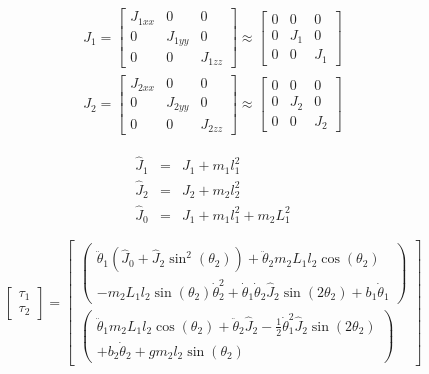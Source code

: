 \begin{eqnarray}
J_1=
\begin{bmatrix}
J_{1xx} & 0 & 0\\
0 & J_{1yy} & 0\\
0 & 0 & J_{1zz}
\end{bmatrix}
\approx
\begin{bmatrix}
0 & 0 & 0\\
0 & J_{1} & 0\\
0 & 0 & J_{1}
\end{bmatrix}
\nonumber \\
J_2=
\begin{bmatrix}
J_{2xx} & 0 & 0\\
0 & J_{2yy} & 0\\
0 & 0 & J_{2zz}
\end{bmatrix}
\approx
\begin{bmatrix}
0 & 0 & 0\\
0 & J_{2} & 0\\
0 & 0 & J_{2}
\end{bmatrix}
\end{eqnarray}

\begin{eqnarray}
\hat{J}_1 &=& J_1 + m_1l^2_1	\nonumber	\\
\hat{J}_2 &=& J_2 + m_2l^2_2	\nonumber	\\
\hat{J}_0 &=& J_1 + m_1l^2_1 + m_2L^2_1
\end{eqnarray}

\begin{equation}
\begin{bmatrix}
\tau_1 \\
\tau_2
\end{bmatrix}
=
\begin{bmatrix}
\begin{pmatrix}
\ddot{\theta}_1(\hat{J}_0+\hat{J}_2\sin^2(\theta_2))+\ddot{\theta}_2m_2L_1l_2\cos(\theta_2)			\\
-m_2L_1l_2\sin(\theta_2)\dot{\theta}^2_2+\dot{\theta}_1\dot{\theta}_2\hat{J}_2\sin(2\theta_2)+b_1\dot{\theta}_1
\end{pmatrix}
\\
\begin{pmatrix}
\ddot{\theta}_1m_2L_1l_2\cos(\theta_2)+\ddot{\theta}_2\hat{J}_2-\frac{1}{2}\dot{\theta}^2_1\hat{J}_2\sin(2\theta_2)						\\
+b_2\dot{\theta}_2+gm_2l_2\sin(\theta_2)
\end{pmatrix}
\end{bmatrix}
\end{equation}


